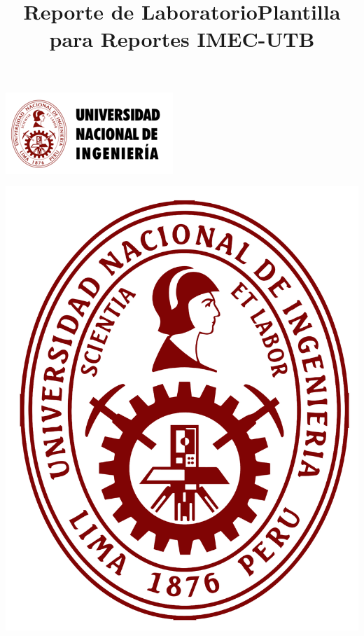 \documentclass[10pt]{article}
\title{Reporte de Laboratorio}
\title{Plantilla para Reportes IMEC-UTB}
\begin{document}
\begin{center}																		%
\newcommand{\HRule}{\rule{\linewidth}{0.5mm}}									%
\begin{minipage}{0.48\textwidth} \begin{flushleft}
\includegraphics[scale = 0.9]{Imagenes/UNI_2.png}
\end{flushleft}\end{minipage}
\begin{minipage}{0.48\textwidth} \begin{flushright}
\includegraphics[scale = 0.075]{Imagenes/UNI.png}
\end{flushright}\end{minipage}


\end{center}
\end{document}
